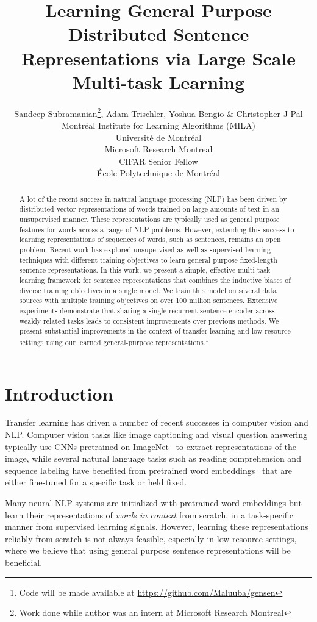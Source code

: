 \documentclass{article} \usepackage{iclr2018_conference,times}
\title{Learning General Purpose Distributed Sentence Representations via Large Scale Multi-task Learning}
\author{Sandeep Subramanian\thanks{Work done while author was an intern at Microsoft Research Montreal}, Adam Trischler, Yoshua Bengio \& Christopher J Pal \\
 Montréal Institute for Learning Algorithms (MILA) \\
 Université de Montréal \\
 Microsoft Research Montreal \\
 CIFAR Senior Fellow \\
 École Polytechnique de Montréal \\
}
\begin{document}
\maketitle

\begin{abstract}
A lot of the recent success in natural language processing (NLP) has been driven by distributed vector representations of words trained on large amounts of text in an unsupervised manner. These representations are typically used as general purpose features for words across a range of NLP problems. However, extending this success to learning representations of sequences of words, such as sentences, remains an open problem. Recent work has explored unsupervised as well as supervised learning techniques with different training objectives to learn general purpose fixed-length sentence representations. In this work, we present a simple, effective multi-task learning framework for sentence representations that combines the inductive biases of diverse training objectives in a single model. 
We train this model on several data sources with multiple training objectives on over 100 million sentences. Extensive experiments demonstrate that sharing a single recurrent sentence encoder across weakly related tasks leads to consistent improvements over previous methods. We present substantial improvements in the context of transfer learning and low-resource settings using our learned general-purpose representations.\footnote{Code will be made available at \url{https://github.com/Maluuba/gensen}}
\end{abstract}

\section{Introduction}
Transfer learning has driven a number of  recent successes in computer vision and NLP.
Computer vision tasks like image captioning \citep{xu2015show} and visual question answering typically use CNNs pretrained on ImageNet~\citep{krizhevsky2012imagenet,simonyan2014very} to extract representations of the image, while several natural language tasks such as reading comprehension and sequence labeling \citep{lample2016neural} have benefited from pretrained word embeddings~\citep{mikolov2013distributed,pennington2014glove} that are either fine-tuned for a specific task or held fixed.

Many neural NLP systems are initialized with pretrained word embeddings but learn their representations of \emph{words in context} from scratch, in a task-specific manner from supervised learning signals. However, learning these representations reliably from scratch is not always feasible, especially in low-resource settings, where we believe that using general purpose sentence representations will be beneficial.
\end{document}
